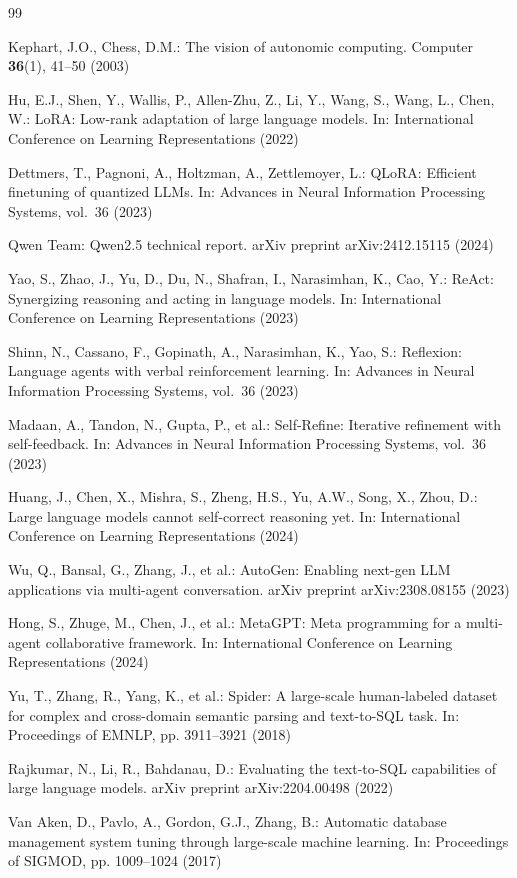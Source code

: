 \documentclass[runningheads]{llncs}
\begin{document}
\begin{thebibliography}{99}

Kephart, J.O., Chess, D.M.: The vision of autonomic computing. Computer \textbf{36}(1), 41--50 (2003)

Hu, E.J., Shen, Y., Wallis, P., Allen-Zhu, Z., Li, Y., Wang, S., Wang, L., Chen, W.: LoRA: Low-rank adaptation of large language models. In: International Conference on Learning Representations (2022)

Dettmers, T., Pagnoni, A., Holtzman, A., Zettlemoyer, L.: QLoRA: Efficient finetuning of quantized LLMs. In: Advances in Neural Information Processing Systems, vol.~36 (2023)

Qwen Team: Qwen2.5 technical report. arXiv preprint arXiv:2412.15115 (2024)

Yao, S., Zhao, J., Yu, D., Du, N., Shafran, I., Narasimhan, K., Cao, Y.: ReAct: Synergizing reasoning and acting in language models. In: International Conference on Learning Representations (2023)

Shinn, N., Cassano, F., Gopinath, A., Narasimhan, K., Yao, S.: Reflexion: Language agents with verbal reinforcement learning. In: Advances in Neural Information Processing Systems, vol.~36 (2023)

Madaan, A., Tandon, N., Gupta, P., et al.: Self-Refine: Iterative refinement with self-feedback. In: Advances in Neural Information Processing Systems, vol.~36 (2023)

Huang, J., Chen, X., Mishra, S., Zheng, H.S., Yu, A.W., Song, X., Zhou, D.: Large language models cannot self-correct reasoning yet. In: International Conference on Learning Representations (2024)

Wu, Q., Bansal, G., Zhang, J., et al.: AutoGen: Enabling next-gen LLM applications via multi-agent conversation. arXiv preprint arXiv:2308.08155 (2023)

Hong, S., Zhuge, M., Chen, J., et al.: MetaGPT: Meta programming for a multi-agent collaborative framework. In: International Conference on Learning Representations (2024)

Yu, T., Zhang, R., Yang, K., et al.: Spider: A large-scale human-labeled dataset for complex and cross-domain semantic parsing and text-to-SQL task. In: Proceedings of EMNLP, pp. 3911--3921 (2018)

Rajkumar, N., Li, R., Bahdanau, D.: Evaluating the text-to-SQL capabilities of large language models. arXiv preprint arXiv:2204.00498 (2022)

Van Aken, D., Pavlo, A., Gordon, G.J., Zhang, B.: Automatic database management system tuning through large-scale machine learning. In: Proceedings of SIGMOD, pp. 1009--1024 (2017)

\end{thebibliography}
\end{document}
